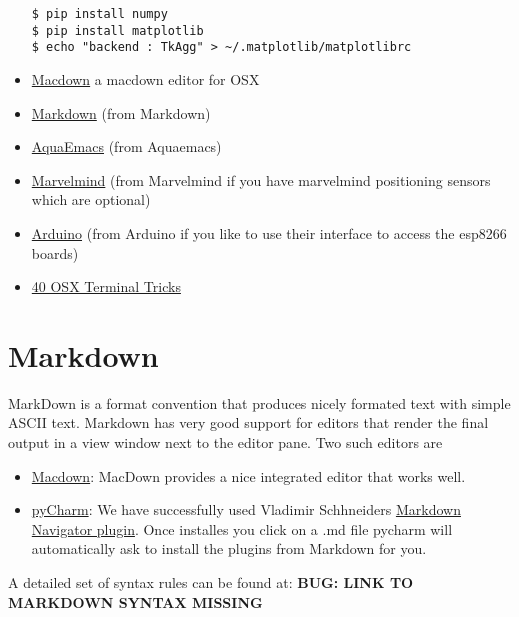 \begin{itemize}
\begin{verbatim}
$ pip install numpy
$ pip install matplotlib
$ echo "backend : TkAgg" > ~/.matplotlib/matplotlibrc
\end{verbatim}
\item
  \href{https://macdown.uranusjr.com/}{Macdown} a macdown editor for OSX
\item
  \href{https://blog.ghost.org/markdown/}{Markdown} (from Markdown)
\item
  \href{http://oracc.museum.upenn.edu/doc/help/usingemacs/aquamacs/}{AquaEmacs}
  (from Aquaemacs)
\item
  \href{http://marvelmind.com/}{Marvelmind} (from Marvelmind if you have
  marvelmind positioning sensors which are optional)
\item
  \href{https://www.arduino.cc/en/guide/macOSX}{Arduino} (from Arduino
  if you like to use their interface to access the esp8266 boards)
\item
  \href{https://computers.tutsplus.com/tutorials/40-terminal-tips-and-tricks-you-never-thought-you-needed--mac-51192}{40
  OSX Terminal Tricks}
\end{itemize}

\section{Markdown}\label{markdown}

MarkDown is a format convention that produces nicely formated text with
simple ASCII text. Markdown has very good support for editors that
render the final output in a view window next to the editor pane. Two
such editors are

\begin{itemize}
\tightlist
\item
  \href{https://macdown.uranusjr.com/}{Macdown}: MacDown provides a nice
  integrated editor that works well.
\item
  \href{https://www.jetbrains.com/pycharm/download/download-thanks.html?platform=mac\&code=PCC}{pyCharm}:
  We have successfully used Vladimir Schhneiders
  \href{https://plugins.jetbrains.com/plugin/7896-markdown-navigator}{Markdown
  Navigator plugin}. Once installes you click on a .md file pycharm will
  automatically ask to install the plugins from Markdown for you.
\end{itemize}

A detailed set of syntax rules can be found at: \textbf{BUG: LINK TO
MARKDOWN SYNTAX MISSING}

